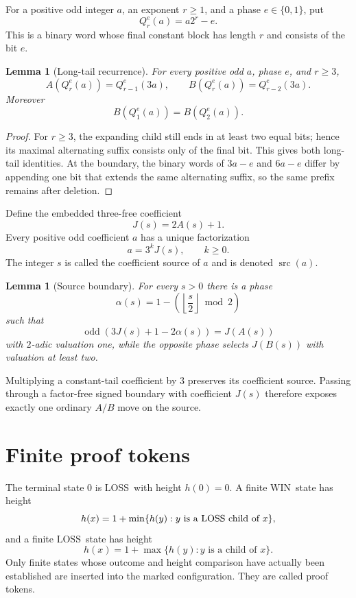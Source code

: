 \documentclass[11pt]{article}
\newtheorem{lemma}[theorem]{Lemma}
\newcommand{\WIN}{\ensuremath{\mathrm{WIN}}}
\newcommand{\LOSS}{\ensuremath{\mathrm{LOSS}}}
\newcommand{\odd}{\operatorname{odd}}
\newcommand{\src}{\operatorname{src}}
\begin{document}
For a positive odd integer $a$, an exponent $r\ge1$, and a phase
$e\in\{0,1\}$, put
\[
  Q_r^e(a)=a2^r-e.
\]
This is a binary word whose final constant block has length $r$ and consists
of the bit $e$.

\begin{lemma}[Long-tail recurrence]\label{lem:long-tail}
For every positive odd $a$, phase $e$, and $r\ge3$,
\[
  A(Q_r^e(a))=Q_{r-1}^e(3a),\qquad
  B(Q_r^e(a))=Q_{r-2}^e(3a).
\]
Moreover
\[
  B(Q_1^e(a))=B(Q_2^e(a)).
\]
\end{lemma}

\begin{proof}
For $r\ge3$, the expanding child still ends in at least two equal bits; hence
its maximal alternating suffix consists only of the final bit. This gives both
long-tail identities. At the boundary, the binary words of $3a-e$ and $6a-e$
differ by appending one bit that extends the same alternating suffix, so the
same prefix remains after deletion.
\end{proof}

Define the embedded three-free coefficient
\[
  J(s)=2A(s)+1.
\]
Every positive odd coefficient $a$ has a unique factorization
\[
  a=3^kJ(s),\qquad k\ge0.
\]
The integer $s$ is called the coefficient source of $a$ and is denoted
$\src(a)$.

\begin{lemma}[Source boundary]\label{lem:source-boundary}
For every $s>0$ there is a phase
\[
  \alpha(s)=1-\left(\left\lfloor\frac{s}{2}\right\rfloor\bmod2\right)
\]
such that
\[
  \odd(3J(s)+1-2\alpha(s))=J(A(s))
\]
with $2$-adic valuation one, while the opposite phase selects $J(B(s))$ with
valuation at least two.
\end{lemma}

Multiplying a constant-tail coefficient by $3$ preserves its coefficient
source. Passing through a factor-free signed boundary with coefficient $J(s)$
therefore exposes exactly one ordinary $A/B$ move on the source.

\section{Finite proof tokens}

The terminal state $0$ is \LOSS\ with height $h(0)=0$. A finite \WIN\ state has
height
\[
  h(x)=1+\min\{h(y):y\text{ is a \LOSS\ child of }x\},
\]
and a finite \LOSS\ state has height
\[
  h(x)=1+\max\{h(y):y\text{ is a child of }x\}.
\]
Only finite states whose outcome and height comparison have actually been
established are inserted into the marked configuration. They are called proof
tokens.
\end{document}
